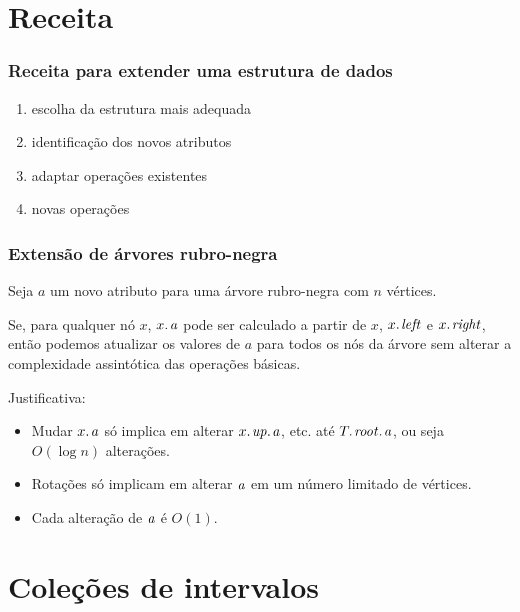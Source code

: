 \documentclass{beamer}
\begin{document}
\section{Receita}
\begin{frame}
\frametitle{Receita para extender uma estrutura de dados}

\begin{enumerate}
\item escolha da estrutura mais adequada
\item identificação dos novos atributos
\item adaptar operações existentes
\item novas operações
\end{enumerate}

\end{frame}

\begin{frame}
\frametitle{Extensão de árvores rubro-negra}

\begin{theorem}
Seja $a$ um novo atributo para uma árvore rubro-negra com $n$ vértices.

Se, para qualquer nó $x$, $\attrib{x}{a}$ pode ser calculado a partir
de $x$, $\attrib{x}{left}$ e $\attrib{x}{right}$, então podemos 
atualizar os valores de $a$ para todos os nós da árvore sem alterar
a complexidade assintótica das operações básicas.
\end{theorem}

\pause

\alert{Justificativa}: 
\begin{itemize}
\item Mudar $\attrib{x}{a}$ só implica em alterar
$\attrib{\attrib{x}{up}}{a}$, etc. até $\attrib{\attrib{T}{root}}{a}$, ou seja $O(\log n)$ alterações.

\item Rotações só implicam em alterar $\id{a}$ em um número limitado de vértices.

\item Cada alteração de $\id{a}$ é $O(1)$.
\end{itemize}

\end{frame}

\section{Coleções de intervalos}
\end{document}
